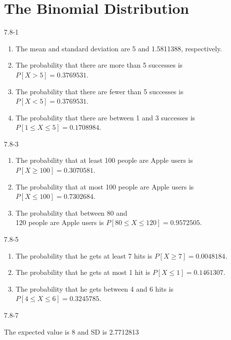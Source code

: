 \setcounter{chapter}{6}\chapter{The Binomial Distribution}
\begin{exsol@solution}{7.8-1}

		\begin{enumerate}
	  \item The mean and standard deviation are 5 and 1.5811388, respectively.
    \item The probability that there are more than 5 successes is $P[ X > 5 ] = 0.3769531$.
    \item The probability that there are fewer than 5 successes is $P[ X < 5 ] = 0.3769531$.
    \item The probability that there  are between 1 and 3 successes  is $P[ 1 \le X \le 5 ] = 0.1708984$.
	  \end{enumerate}
\end{exsol@solution}
\begin{exsol@solution}{7.8-3}

\begin{enumerate}
\item The probability that at least 100 people are Apple users is $P[X \ge 100] = 0.3070581$.
\item The probability that at most 100 people are Apple users is $P[X \le 100] = 0.7302684$.
\item The probability that between 80 and \\ 120 people are Apple users is $P[ 80 \le X \le 120] = 0.9572505$.
\end{enumerate}
\end{exsol@solution}
\begin{exsol@solution}{7.8-5}

\begin{enumerate}
\item The probability that he gets at least 7 hits is $P[X \ge 7] = 0.0048184$.
\item The probability that he gets at most 1 hit is $P[X \le 1] = 0.1461307$.
\item The probability that he gets between 4 and 6 hits is $P[4 \le X \le 6] = 0.3245785$.
\end{enumerate}

\end{exsol@solution}
\begin{exsol@solution}{7.8-7}

The expected value is 8 and SD is 2.7712813
\end{exsol@solution}
